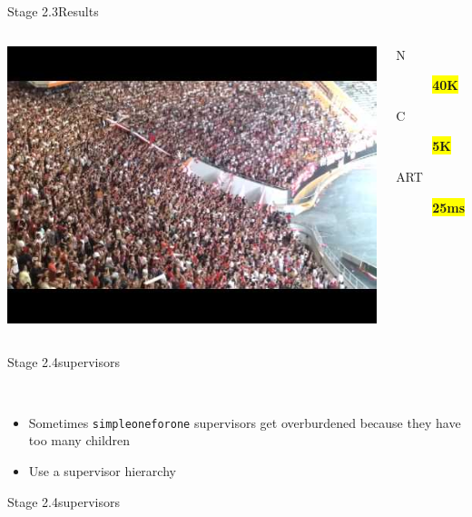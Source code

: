 \documentclass[utf8]{beamer}
\begin{document}
\begin{frame}{Stage 2.3}{Results}
	\begin{columns}
			\includegraphics[top=-1,width=\textwidth]{img/results-3-3.jpg}
			\begin{description}
				\item[N] \textbf{\colorbox{yellow}{\Large 40K}}
				\item[C] \textbf{\colorbox{yellow}{\Large 5K}}
				\item[ART] \textbf{\colorbox{yellow}{\Large 25ms}}
			\end{description}
	\end{columns}
\end{frame}
\begin{frame}{Stage 2.4}{supervisors}
	\begin{description}
		\item<+->[Simple One for One Supervisors]\ \\
			\begin{itemize}
				\item Sometimes \texttt{simple\textunderscore one\textunderscore for\textunderscore one} supervisors get \alert{overburdened} because they have too many children
				\item Use a supervisor hierarchy
			\end{itemize}
	\end{description}
\end{frame}
\begin{frame}{Stage 2.4}{supervisors}
\end{frame}
\end{document}
